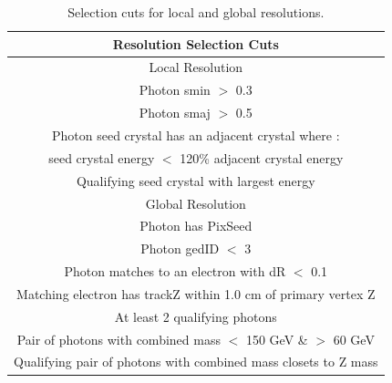 \hfill
\begin{table}[h!]
\begin{center}
 \begin{tabular}{ |c| }
 \hline
 Resolution Selection Cuts \\
 \hline
 \hline
 Local Resolution\\
 \hline
  Photon smin $>$ 0.3 \\
  Photon smaj $>$ 0.5 \\
  Photon seed crystal has an adjacent crystal where : \\ 
  seed crystal energy $<$ 120\% adjacent crystal energy \\
  Qualifying seed crystal with largest energy \\
 \hline
 Global Resolution\\
 \hline
  Photon has PixSeed \\
  Photon gedID $<$ 3 \\
  Photon matches to an electron with dR $<$ 0.1  \\
  Matching electron has trackZ within 1.0 cm of primary vertex Z \\
  At least 2 qualifying photons \\
  Pair of photons with combined mass $<$ 150 GeV \& $>$ 60 GeV \\
  Qualifying pair of photons with combined mass closets to Z mass \\
\hline
\end{tabular}
\end{center}
\caption{Selection cuts for local and global resolutions.}
\label{res_params}
\end{table}
